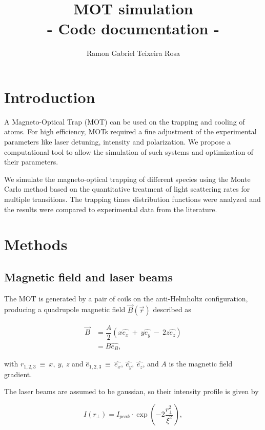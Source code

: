\documentclass[12pt,a4paper,twoside]{article}
\author{Ramon Gabriel Teixeira Rosa}
\title{%
\textbf{MOT simulation}\\
\large \textbf{- Code documentation -}}
\begin{document}
{
	\maketitle
}

\section{Introduction}

A Magneto-Optical Trap (MOT) can be used on the trapping and cooling of atoms. For high efficiency, MOTs required a fine adjustment of the experimental parameters like laser detuning, intensity and polarization. We propose a computational tool to allow the simulation of such systems and optimization of their parameters.

We simulate the magneto-optical trapping of different species using the Monte Carlo method based on the quantitative treatment of light scattering rates for multiple transitions. The trapping times distribution functions were analyzed and the results were compared to experimental data from the literature.

\section{Methods}

\subsection{Magnetic field and laser beams}

The MOT is generated by a pair of coils on the anti-Helmholtz configuration, producing a quadrupole magnetic field $\vec{B}(\vec{r})$ described as 

\begin{align}
	\vec{B} &= \dfrac{A}{2} \left(x\hat{e_x}\ +\ y\hat{e_y}\ -\ 2z\hat{e_z}\right) \nonumber \\
			&= B\hat{e_B},
	\label{eq.magfield}
\end{align}

\noindent
with $r_{1,2,3}\ \equiv\ x,\ y,\ z$ and $\hat{e}_{1,2,3}\ \equiv\ {\hat{e_x},\ \hat{e_y},\ \hat{e_z}}$, and $A$ is the magnetic field gradient.


The laser beams are assumed to be gaussian, so their intensity profile is given by

\begin{equation}
	I(r_{\perp}) = I_{peak}\cdot \exp\left( -2\dfrac{r_{\perp}^2}{\xi^2} \right),
	\label{eq.gaussianbeam}
\end{equation}
\end{document}
